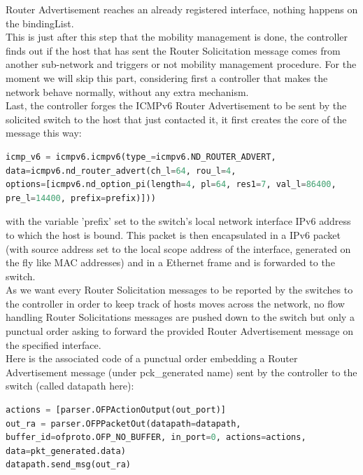 \documentclass{article}
\begin{document}
Router Advertisement reaches an already registered interface, nothing
happens on the bindingList.\\
\newline
This is just after this step that the mobility management is done,
the controller finds out if the host that has sent the Router
Solicitation message comes from another sub-network and triggers or
not mobility management procedure. For the moment we will skip this
part, considering first a controller that makes the network behave
normally, without any extra mechanism.\\
\newline
Last, the controller forges the ICMPv6 Router Advertisement to be sent
by the solicited switch to the host that just contacted it, it first
creates the core of the message this way: 

\begin{lstlisting}[frame=single,language=Python,breaklines=true ] 
icmp_v6 = icmpv6.icmpv6(type_=icmpv6.ND_ROUTER_ADVERT,
data=icmpv6.nd_router_advert(ch_l=64, rou_l=4,
options=[icmpv6.nd_option_pi(length=4, pl=64, res1=7, val_l=86400,
pre_l=14400, prefix=prefix)]))
\end{lstlisting}

with the variable 'prefix' set to the switch's local network interface
IPv6 address to which the host is bound. This packet is then
encapsulated in a IPv6 packet (with source address set to the local
scope address of the interface, generated on the fly like MAC
addresses) and in a Ethernet frame and is forwarded to the switch.\\ 
\newline
As we want every Router Solicitation messages to be reported by the
switches to the controller in order to keep track of hosts moves across
the network, no flow handling Router Solicitations messages are pushed
down to the switch but only a punctual order asking to forward the
provided Router Advertisement message on the specified interface.\\
\newline
Here is the associated code of a punctual order embedding a Router
Advertisement message (under pck\_generated name) sent by the controller
to the switch (called datapath here):

\begin{lstlisting}[frame=single,language=Python, breaklines=true] 
actions = [parser.OFPActionOutput(out_port)] 
out_ra = parser.OFPPacketOut(datapath=datapath,
buffer_id=ofproto.OFP_NO_BUFFER, in_port=0, actions=actions,
data=pkt_generated.data) 
datapath.send_msg(out_ra)
\end{lstlisting}
\end{document}
